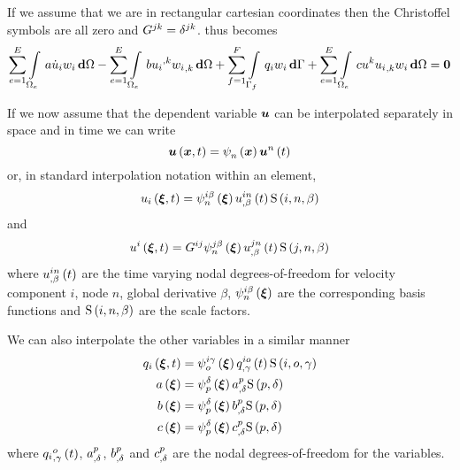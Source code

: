 If we assume that we are in rectangular cartesian coordinates then the
Christoffel symbols are all zero and
$G^{jk}=\contrakronecker{j}{k}$.  thus becomes
\begin{equation}
  \dsum_{e=1}^{E}\gint{\Omega_{e}}{}{a\dot{u}_{i}w_{i}}{\Omega}-
  \dsum_{e=1}^{E}\gint{\Omega_{e}}{}{b\contrapartialderiv{u_{i}}{k}
    \partialderiv{w_{i}}{k}}{\Omega}+ 
  \dsum_{f=1}^{F}\gint{\Gamma_{f}}{}{q_{i}w_{i}}{\Gamma} +
  \dsum_{e=1}^{E}\gint{\Omega_{e}}{}{cu^{k}\partialderiv{u_{i}}{k}w_{i}}{\Omega}=\vectr{0}
  \label{eqn:Burgersfemform2}
\end{equation}

If we now assume that the dependent variable $\vectr{u}$ can be interpolated
separately in space and in time we can write
\begin{equation}
  \fnof{\vectr{u}}{\vectr{x},t}=\gbfn{n}{}{\vectr{x}}\fnof{\nodept{\vectr{u}}{n}}{t}
\end{equation}
or, in standard interpolation notation within an element,
\begin{equation}
  \fnof{u_{i}}{\vectr{\xi},t}=\idxgbfn{i}{n}{\beta}{\vectr{\xi}}
  \fnof{\idxnodedof{u}{i}{n}{\beta}}{t}\idxgsf{i}{n}{\beta}
\end{equation}
and
\begin{equation}
  \fnof{u^{i}}{\vectr{\xi},t}=G^{ij}\idxgbfn{j}{n}{\beta}{\vectr{\xi}}
  \fnof{\idxnodedof{u}{j}{n}{\beta}}{t}\idxgsf{j}{n}{\beta}
\end{equation}
where $\fnof{\idxnodedof{u}{i}{n}{\beta}}{t}$ are the time varying nodal
degrees-of-freedom for velocity component $i$, node $n$, global derivative $\beta$,
$\idxgbfn{i}{n}{\beta}{\vectr{\xi}}$ are the corresponding basis functions 
and $\idxgsf{i}{n}{\beta}$ are the scale factors. 

We can also interpolate the other variables in a similar manner \ie
\begin{equation}
  \begin{split}
    \fnof{q_{i}}{\vectr{\xi},t} &= \idxgbfn{i}{o}{\gamma}{\vectr{\xi}}
    \fnof{\idxnodedof{q}{i}{o}{\gamma}}{t}\idxgsf{i}{o}{\gamma} \\
    \fnof{a}{\vectr{\xi}} &=\gbfn{p}{\delta}{\vectr{\xi}}
    \nodedof{a}{p}{\delta}\gsf{p}{\delta} \\
    \fnof{b}{\vectr{\xi}} &=\gbfn{p}{\delta}{\vectr{\xi}}\nodedof{b}{p}{\delta}
    \gsf{p}{\delta} \\
    \fnof{c}{\vectr{\xi}}
    &=\gbfn{p}{\delta}{\vectr{\xi}}\nodedof{c}{p}{\delta}\gsf{p}{\delta}
  \end{split}
\end{equation}
where $\fnof{\nodedof{q_{i}}{o}{\gamma}}{t}$, $\nodedof{a}{p}{\delta}$,
$\nodedof{b}{p}{\delta}$ and $\nodedof{c}{p}{\delta}$ are the
nodal degrees-of-freedom for the variables.

